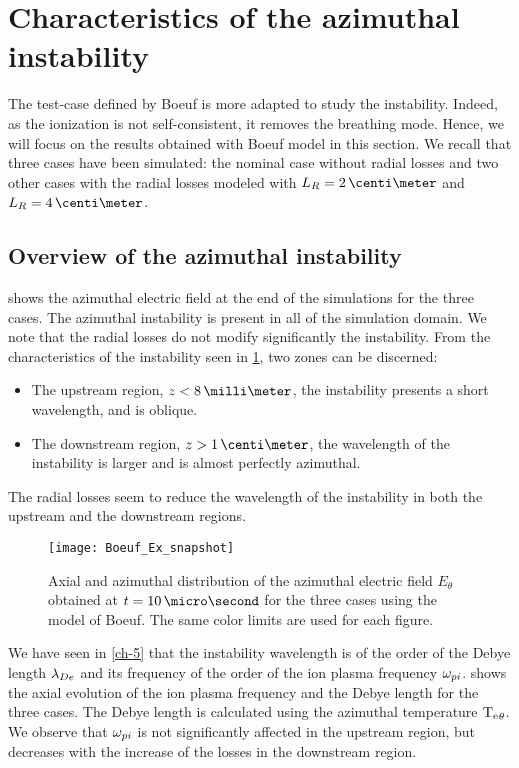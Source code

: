 
\FloatBarrier
\section{Characteristics of the azimuthal instability}

The test-case defined by Boeuf is more adapted to  study the instability.
Indeed, as the ionization is not self-consistent, it removes the breathing mode.
Hence, we will focus on the results obtained with Boeuf model in this section.
We recall that three cases have been simulated\string: the nominal case without radial losses and two other cases with the radial losses modeled with $L_R=2\,\centi\meter$ and $L_R=4\,\centi\meter$.

\subsection{Overview of the azimuthal instability} \label{subsec-azi_insta_Ztheta}
 shows the azimuthal electric field at the end of the simulations for the three cases.
The azimuthal instability is present in all of the simulation domain.
We note that the radial losses do not modify significantly the instability.
From the characteristics of the instability seen in \cref{fig-snapshots}, two zones can be discerned\string:
\begin{itemize}
  \item The upstream region, $z < 8 \,\milli\meter$, the instability presents a short wavelength, and is oblique.
  \item The downstream region, $z > 1\,\centi\meter$, the wavelength of the instability is larger and is almost perfectly azimuthal.
\end{itemize}
The radial losses seem to reduce the wavelength of the instability in both the upstream and the downstream regions.


\begin{figure}[hbt]
  \centering
  \texttt{[image: Boeuf\_Ex\_snapshot]}
  \caption{Axial and azimuthal distribution of the azimuthal electric field $E_{\theta}$  obtained at $t=10 \,\micro\second$ for the three cases using the model of Boeuf. The same color limits are used for each figure.}
  \label{fig-snapshots}
\end{figure}

We have seen in \cref{ch-5} that the instability wavelength is of the order of the Debye length $\lambda_{De}$ and its frequency of the order of the ion plasma frequency $\omega_{pi}$.
 shows the axial evolution of the ion plasma frequency and the Debye length for the three cases.
The Debye length is calculated using the azimuthal temperature $\mathrm{T_e}_{\theta}$.
We observe that $\omega_{pi}$ is not significantly affected in the upstream region, but decreases with the increase of the losses in the downstream region.

